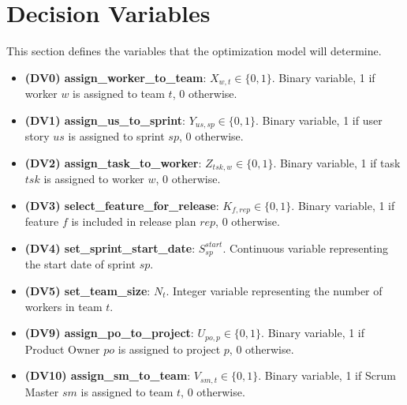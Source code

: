 \documentclass[11pt]{article}
\begin{document}
\section{Decision Variables}
This section defines the variables that the optimization model will determine.
\begin{itemize}
    \item \textbf{(DV0) assign\_worker\_to\_team}: 
    $X_{w,t} \in \{0, 1\}$. Binary variable, 1 if worker $w$ is assigned to team $t$, 0 otherwise.
    
    \item \textbf{(DV1) assign\_us\_to\_sprint}: 
    $Y_{us,sp} \in \{0, 1\}$. Binary variable, 1 if user story $us$ is assigned to sprint $sp$, 0 otherwise.
    
    \item \textbf{(DV2) assign\_task\_to\_worker}: 
    $Z_{tsk,w} \in \{0, 1\}$. Binary variable, 1 if task $tsk$ is assigned to worker $w$, 0 otherwise.
    
    \item \textbf{(DV3) select\_feature\_for\_release}: 
    $K_{f,rep} \in \{0, 1\}$. Binary variable, 1 if feature $f$ is included in release plan $rep$, 0 otherwise.
    
    \item \textbf{(DV4) set\_sprint\_start\_date}: 
    $S_{sp}^{start}$. Continuous variable representing the start date of sprint $sp$.
    
    \item \textbf{(DV5) set\_team\_size}: 
    $N_t$. Integer variable representing the number of workers in team $t$.
    
    \item \textbf{(DV9) assign\_po\_to\_project}:
    $U_{po,p} \in \{0,1\}$. Binary variable, 1 if Product Owner $po$ is assigned to project $p$, 0 otherwise.

    \item \textbf{(DV10) assign\_sm\_to\_team}:
    $V_{sm,t} \in \{0,1\}$. Binary variable, 1 if Scrum Master $sm$ is assigned to team $t$, 0 otherwise.

\end{itemize}
\end{document}
